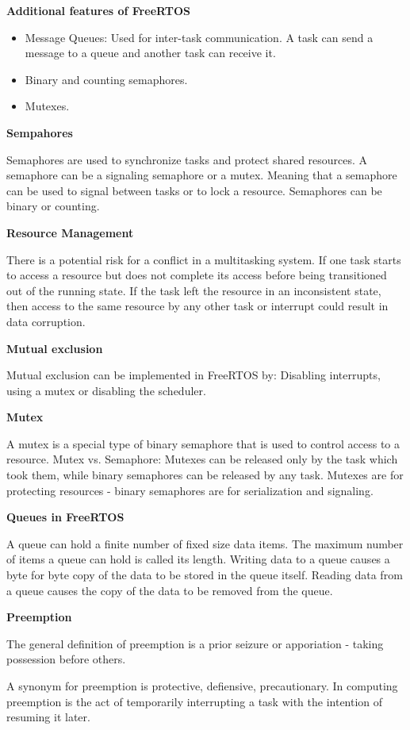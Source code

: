 \textbf{Additional features of FreeRTOS}

\begin{itemize}
	\item Message Queues: Used for inter-task communication. A task can send a message to a queue and another task can receive it.
	\item Binary and counting semaphores.
	\item Mutexes.
\end{itemize}



\textbf{Sempahores}

Semaphores are used to synchronize tasks and protect shared resources.
A semaphore can be a signaling semaphore or a mutex.
Meaning that a semaphore can be used to signal between tasks or to lock a resource.
Semaphores can be binary or counting.

\textbf{Resource Management}

There is a potential risk for a conflict in a multitasking system. If one task starts to access a resource
but does not complete its access before being transitioned out of the running state. If the task left the resource
in an inconsistent state, then access to the same resource by any other task or interrupt could result in data corruption.

\textbf{Mutual exclusion}

Mutual exclusion can be implemented in FreeRTOS by: Disabling interrupts, using a mutex or disabling the scheduler.

\textbf{Mutex}

A mutex is a special type of binary semaphore that is used to control access to a resource.
Mutex vs. Semaphore: Mutexes can be released only by the task which took them, while binary semaphores can be released
by any task. Mutexes are for protecting resources - binary semaphores are for serialization and signaling.


\textbf{Queues in FreeRTOS}

A queue can hold a finite number of fixed size data items.
The maximum number of items a queue can hold is called its length.
Writing data to a queue causes a byte for byte copy of the data to be
stored in the queue itself. Reading data from a queue causes the
copy of the data to be removed from the queue.


\textbf{Preemption}

The general definition of preemption is a prior seizure
or apporiation - taking possession before others.

A synonym for preemption is protective, defiensive, precautionary.
In computing preemption is the act of temporarily interrupting a task
with the intention of resuming it later.



